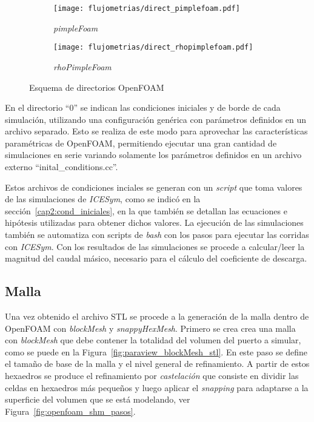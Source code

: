 \begin{figure}[h!]
  \centering
  \begin{subfigure}[b]{0.4\textwidth}
    \centering
    \texttt{[image: flujometrias/direct\_pimplefoam.pdf]}
    \caption{\emph{pimpleFoam}\label{fig:direc_pf} }
  \end{subfigure}%
  \begin{subfigure}[b]{0.4\textwidth}
    \centering
    \texttt{[image: flujometrias/direct\_rhopimplefoam.pdf]}
    \caption{\emph{rhoPimpleFoam}\label{fig:direc_rpf} }
  \end{subfigure}
  \caption{Esquema de directorios OpenFOAM}
\end{figure}


En el directorio ``0'' se indican las condiciones iniciales y de borde de cada
simulación, utilizando una configuración genérica con parámetros definidos en un
archivo separado.
%
Esto se realiza de este modo para aprovechar las características paramétricas de
OpenFOAM, permitiendo ejecutar una gran cantidad de simulaciones en serie
variando solamente los parámetros definidos en un archivo externo
``inital\_conditions.cc''.

Estos archivos de condiciones inciales se generan con un \emph{script} que toma
valores de las simulaciones de \emph{ICESym}, como se indicó en la
sección~\ref{cap2:cond_iniciales}, en la que también se detallan las ecuaciones
e hipótesis utilizadas para obtener dichos valores.
%
La ejecución de las simulaciones también se automatiza con scripts de
\emph{bash} con los pasos para ejecutar las corridas con \emph{ICESym}.
%
Con los resultados de las simulaciones se procede a calcular/leer la magnitud
del caudal másico, necesario para el cálculo del coeficiente de descarga.


\subsection{Malla}\label{sec:cap3_of_malla}
%
Una vez obtenido el archivo STL se procede a la generación de la malla dentro de
OpenFOAM con \emph{blockMesh} y \emph{snappyHexMesh}.
%
Primero se crea crea una malla con \emph{blockMesh} que  debe contener la
totalidad del volumen del puerto a simular, como se puede en la
Figura~\ref{fig:paraview_blockMesh_stl}.
%
En este paso se define el tamaño de base de la malla y el nivel general de
refinamiento.
%
A partir de estos hexaedros se produce el refinamiento por \emph{castelación}
que consiste en dividir las celdas en hexaedros más pequeños y luego aplicar el
\emph{snapping} para adaptarse a la superficie del volumen que se está
modelando, ver Figura~\ref{fig:openfoam_shm_pasos}.
%

